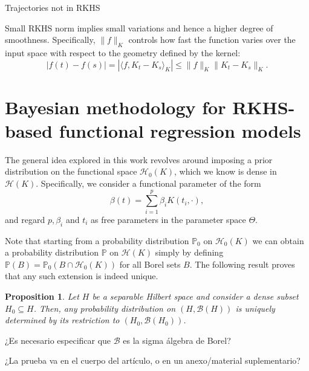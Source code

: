 \documentclass[ba]{imsart}
\numberwithin{equation}{section}
\theoremstyle{plain}
\newtheorem{prop}{Proposition}[section]
\newenvironment{comment}
{
\noindent \em \color{red}
}
{
\color{black}
}
\begin{document}
\begin{comment}
  Trajectories not in RKHS
\end{comment}

\begin{comment}
  Small RKHS norm implies small variations and hence a higher degree of smoothness. Specifically, \(\|f\|_K\) controls how fast the function varies over the input space with respect to the geometry defined by the kernel:
  \[
  |f(t) - f(s)| = |\langle f, K_t - K_s\rangle_K| \leq \|f\|_K \|K_t - K_s\|_K.
  \]
\end{comment}


\section{Bayesian methodology for RKHS-based functional regression models}

The general idea explored in this work revolves around imposing a prior distribution on the functional space \(\mathcal H_0(K)\), which we know is dense in \(\mathcal H(K)\). Specifically, we consider a functional parameter of the form
\begin{equation}\label{eq:parameter-rkhs}
  \beta(t) = \sum_{i=1}^p \beta_i K(t_i, \cdot),
\end{equation}
and regard \(p, \beta_i\) and \(t_i\) as free parameters in the parameter space \(\Theta\).

Note that starting from a probability distribution \(\mathbb{P}_0\) on \(\mathcal H_0(K)\) we can obtain a probability distribution \(\mathbb{P}\) on \(\mathcal H(K)\) simply by defining \(\mathbb{P}(B) = \mathbb{P}_0(B\cap \mathcal H_0(K))\) for all Borel sets \(B\). The following result proves that any such extension is indeed unique.

\begin{prop} Let \(H\) be a separable Hilbert space and consider a dense subset \(H_0\subseteq H\). Then, any probability distribution on \((H, \mathcal{B}(H))\) is uniquely determined by its restriction to \((H_0, \mathcal B(H_0))\).
\end{prop}

\begin{comment}
  ¿Es necesario especificar que \(\mathcal B\) es la sigma álgebra de Borel?
\end{comment}

\begin{comment}
    ¿La prueba va en el cuerpo del artículo, o en un anexo/material suplementario?
\end{comment}
\end{document}
